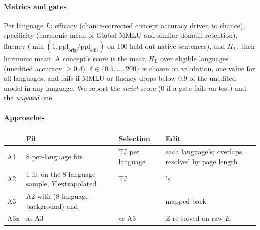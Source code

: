 \paragraph{Metrics and gates}
Per language $L$: efficacy (chance-corrected concept accuracy driven to chance), specificity (harmonic mean of Global-MMLU and similar-domain retention), fluency ($\min(1, \text{ppl}_{\text{orig}}/\text{ppl}_{\text{edit}})$ on 100 held-out native sentences), and $H_L$, their harmonic mean.
A concept's score is the mean $H_L$ over eligible languages (unedited accuracy $\geq 0.4$).
$\delta \in \{0.5, \dots, 200\}$ is chosen on validation, one value for all languages, and fails if MMLU or fluency drops below 0.9 of the unedited model in any language.
We report the \emph{strict} score (0 if a gate fails on test) and the \emph{ungated} one.

\paragraph{Approaches}

\begin{center}
\small
\setlength{\tabcolsep}{2.5pt}
\begin{tabular}{@{}lP{2.05cm}P{1.7cm}P{1.95cm}@{}}
\toprule
 & Fit & Selection & Edit \\
\midrule
A1 & 8 per-language \ember{} fits & TJ per language & each language's; overlaps resolved by page length \\
A2 & 1 fit on the 8-language sample, $Y$ extrapolated & TJ & \ember{}'s \\
A3 & A2 with \cs{} (8-language background) and \gs{} & \twj{} & mapped back \\
A3z & as A3 & as A3 & $Z$ re-solved on raw $E$ \\
\bottomrule
\end{tabular}
\end{center}

